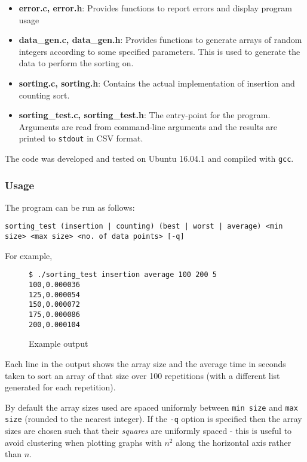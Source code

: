 \documentclass{article}
\begin{document}
\begin{itemize}
\item \textbf{error.c, error.h}: Provides functions to report errors and display program usage

\item \textbf{data\_gen.c, data\_gen.h}: Provides functions to generate arrays of random integers according to some specified parameters. This is used to generate the data to perform the sorting on.

\item \textbf{sorting.c, sorting.h}: Contains the actual implementation of insertion and counting sort.

\item \textbf{sorting\_test.c, sorting\_test.h}: The entry-point for the program. Arguments are read from command-line arguments and the results are printed to \texttt{stdout} in CSV format.

\end{itemize}

The code was developed and tested on Ubuntu 16.04.1 and compiled with \texttt{gcc}.

\subsubsection{Usage}

The program can be run as follows:

\small\texttt{sorting\_test (insertion | counting) (best | worst | average) <min size> <max size> <no. of data points> [-q]}

For example,

\begin{figure}[H]
	\centering
	\begin{BVerbatim}
$ ./sorting_test insertion average 100 200 5
100,0.000036
125,0.000054
150,0.000072
175,0.000086
200,0.000104
	\end{BVerbatim}
	\caption{Example output}
	\label{ex-output}
\end{figure}

Each line in the output shows the array size and the average time in seconds taken to sort an array of that size over 100 repetitions (with a different list generated for each repetition).

By default the array sizes used are spaced uniformly between \texttt{min size} and \texttt{max size} (rounded to the nearest integer). If the \texttt{-q} option is specified then the array sizes are chosen such that their \textit{squares} are uniformly spaced - this is useful to avoid clustering when plotting graphs with $n^2$ along the horizontal axis rather than $n$.
\end{document}
